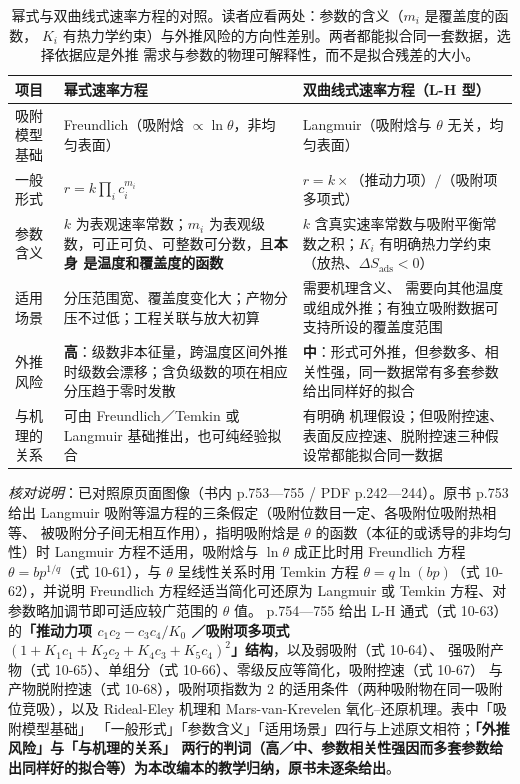 \begin{table}[htbp]
\centering
\caption{幂式与双曲线式速率方程的对照。读者应看两处：参数的含义（$m_i$ 是覆盖度的函数，
$K_i$ 有热力学约束）与外推风险的方向性差别。两者都能拟合同一套数据，选择依据应是外推
需求与参数的物理可解释性，而不是拟合残差的大小。}
\label{tab:power-vs-hyp}
{\srcsize
\begin{tabularx}{\columnwidth}{@{}lXX@{}}
\toprule
项目 & 幂式速率方程 & 双曲线式速率方程（L-H 型） \\
\midrule
吸附模型基础 & Freundlich（吸附焓 $\propto\ln\theta$，非均匀表面）& Langmuir（吸附焓与
$\theta$ 无关，均匀表面）\\
\addlinespace
一般形式 & $r=k\prod_i c_i^{m_i}$ & $r=k\times$（推动力项）$/$（吸附项多项式）\\
\addlinespace
参数含义 & $k$ 为表观速率常数；$m_i$ 为表观级数，可正可负、可整数可分数，且\textbf{本身
是温度和覆盖度的函数} & $k$ 含真实速率常数与吸附平衡常数之积；$K_i$ 有明确热力学约束
（放热、$\Delta S_{\mathrm{ads}}<0$）\\
\addlinespace
适用场景 & 分压范围宽、覆盖度变化大；产物分压不过低；工程关联与放大初算 & 需要机理含义、
需要向其他温度或组成外推；有独立吸附数据可支持所设的覆盖度范围\\
\addlinespace
外推风险 & \textbf{高}：级数非本征量，跨温度区间外推时级数会漂移；含负级数的项在相应
分压趋于零时发散 & \textbf{中}：形式可外推，但参数多、相关性强，同一数据常有多套参数
给出同样好的拟合\\
\addlinespace
与机理的关系 & 可由 Freundlich／Temkin 或 Langmuir 基础推出，也可纯经验拟合 & 有明确
机理假设；但吸附控速、表面反应控速、脱附控速三种假设常都能拟合同一数据\\
\bottomrule
\end{tabularx}}
\end{table}

\emph{核对说明}：已对照原页面图像（书内 p.753—755 / PDF p.242—244）。原书
p.753 给出 Langmuir 吸附等温方程的三条假定（吸附位数目一定、各吸附位吸附热相等、
被吸附分子间无相互作用），指明吸附焓是 $\theta$ 的函数（本征的或诱导的非均匀性）时 Langmuir
方程不适用，吸附焓与 $\ln\theta$ 成正比时用 Freundlich 方程
$\theta=bp^{1/q}$（式 10-61），与 $\theta$ 呈线性关系时用 Temkin 方程
$\theta=q\ln(bp)$（式 10-62），并说明 Freundlich 方程经适当简化可还原为
Langmuir 或 Temkin 方程、对参数略加调节即可适应较广范围的 $\theta$ 值。
p.754—755 给出 L-H 通式（式 10-63）的\textbf{「推动力项
$c_1c_2-c_3c_4/K_0$ ／吸附项多项式
$(1+K_1c_1+K_2c_2+K_4c_3+K_5c_4)^{2}$」结构}，以及弱吸附（式 10-64）、
强吸附产物（式 10-65）、单组分（式 10-66）、零级反应等简化，吸附控速（式 10-67）
与产物脱附控速（式 10-68），吸附项指数为 $2$ 的适用条件（两种吸附物在同一吸附位竞吸），以及
Rideal-Eley 机理和 Mars-van-Krevelen 氧化--还原机理。表中「吸附模型基础」
「一般形式」「参数含义」「适用场景」四行与上述原文相符；\textbf{「外推风险」与「与机理的关系」
两行的判词（高／中、参数相关性强因而多套参数给出同样好的拟合等）为本改编本的教学归纳，原书未逐条给出}。


